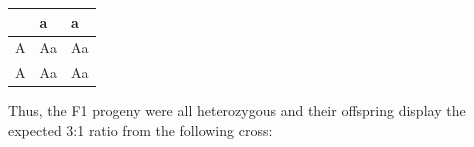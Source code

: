 \documentclass[11pt,]{article}
\begin{document}
\begin{blackbox}
\begin{longtable}[]{@{}lll@{}}
\toprule
\begin{minipage}[b]{0.09\columnwidth}\raggedright
\strut
\end{minipage} & \begin{minipage}[b]{0.11\columnwidth}\raggedright
a\strut
\end{minipage} & \begin{minipage}[b]{0.11\columnwidth}\raggedright
a\strut
\end{minipage}\tabularnewline
\midrule
\endhead
\begin{minipage}[t]{0.09\columnwidth}\raggedright
A\strut
\end{minipage} & \begin{minipage}[t]{0.11\columnwidth}\raggedright
Aa\strut
\end{minipage} & \begin{minipage}[t]{0.11\columnwidth}\raggedright
Aa\strut
\end{minipage}\tabularnewline
\begin{minipage}[t]{0.09\columnwidth}\raggedright
A\strut
\end{minipage} & \begin{minipage}[t]{0.11\columnwidth}\raggedright
Aa\strut
\end{minipage} & \begin{minipage}[t]{0.11\columnwidth}\raggedright
Aa\strut
\end{minipage}\tabularnewline
\bottomrule
\end{longtable}

Thus, the F1 progeny were all heterozygous and their offspring display
the expected 3:1 ratio from the following cross:


\end{blackbox}
\end{document}
